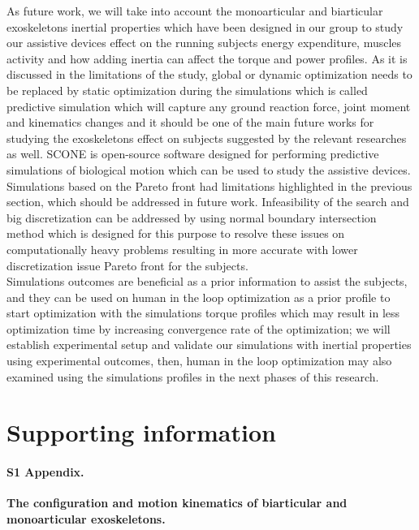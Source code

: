 \documentclass[10pt,letterpaper]{article}
\begin{document}
As future work, we will take into account the monoarticular and biarticular exoskeletons inertial properties which have been designed in our group to study our assistive devices effect on the running subjects energy expenditure, muscles activity and how adding inertia can affect the torque and power profiles. As it is discussed in the limitations of the study, global or dynamic optimization needs to be replaced by static optimization during the simulations which is called predictive simulation \cite{111,112} which will capture any ground reaction force, joint moment and kinematics changes and it should be one of the main future works for studying the exoskeletons effect on subjects suggested by the relevant researches \cite{2,93} as well. SCONE \cite{110} is open-source software designed for performing predictive simulations of biological motion which can be used to study the assistive devices.\\
Simulations based on the Pareto front had limitations highlighted in the previous section, which should be addressed in future work. Infeasibility of the search and big discretization can be addressed by using normal boundary intersection method \cite{108} which is designed for this purpose to resolve these issues on computationally heavy problems resulting in more accurate with lower discretization issue Pareto front for the subjects.\\
Simulations outcomes are beneficial as a prior information to assist the subjects, and they can be used on human in the loop optimization \cite{109} as a prior profile to start optimization with the simulations  torque profiles which may result in less optimization time by increasing convergence rate of the optimization; we will establish experimental setup and validate our simulations with inertial properties using experimental outcomes, then, human in the loop optimization may also examined using the simulations profiles in the next phases of this research.\\
\section*{Supporting information}

\paragraph*{S1 Appendix.}
\label{S1_Appendix}
{\bf The configuration and motion kinematics of biarticular and monoarticular exoskeletons.}
\end{document}
